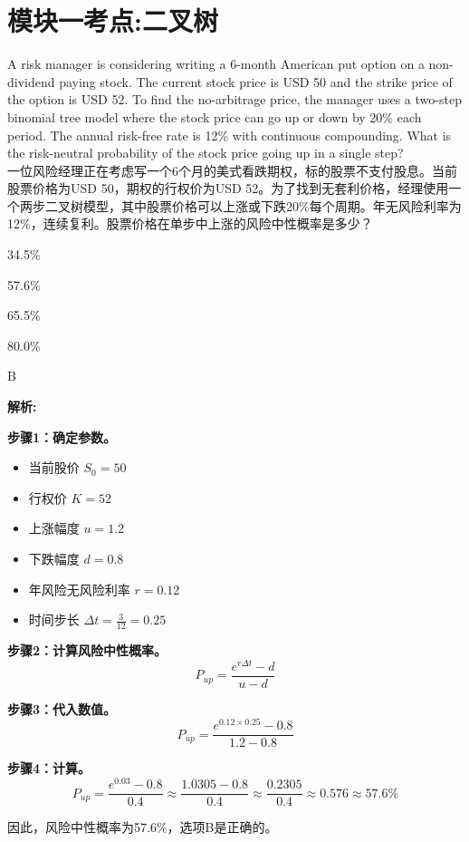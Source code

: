 \documentclass{article}
\newcounter{question} %
\newenvironment{explanation}
{\textbf{解析:}\par}
{\par}
\begin{document}
 \tableofcontents %
\newpage



\iftrue
\section{模块一考点:二叉树}
\setcounter{question}{0}


\begin{question}
    A risk manager is considering writing a 6-month American put option on a non-dividend paying stock. The current stock price is USD 50 and the strike price of the option is USD 52. To find the no-arbitrage price, the manager uses a two-step binomial tree model where the stock price can go up or down by 20\% each period. The annual risk-free rate is 12\% with continuous compounding. What is the risk-neutral probability of the stock price going up in a single step?\\
    一位风险经理正在考虑写一个6个月的美式看跌期权，标的股票不支付股息。当前股票价格为USD 50，期权的行权价为USD 52。为了找到无套利价格，经理使用一个两步二叉树模型，其中股票价格可以上涨或下跌20\%每个周期。年无风险利率为12\%，连续复利。股票价格在单步中上涨的风险中性概率是多少？
\end{question}

\begin{choices}
    \item 34.5\%
    \item 57.6\%
    \item 65.5\%
    \item 80.0\%
\end{choices}

\begin{correctanswer}
    B
\end{correctanswer}

\begin{explanation}
 \textbf{步骤1：确定参数。}
        \begin{itemize}
            \item 当前股价 \( S_0 = 50 \)
            \item 行权价 \( K = 52 \)
            \item 上涨幅度 \( u = 1.2 \)
            \item 下跌幅度 \( d = 0.8 \)
            \item 年风险无风险利率 \( r = 0.12 \)
            \item 时间步长 \( \Delta t = \frac{3}{12} = 0.25 \)
        \end{itemize}

      \textbf{步骤2：计算风险中性概率。}
        \[
        P_{up} = \frac{e^{r \Delta t} - d}{u - d}
        \]

     \textbf{步骤3：代入数值。}
        \[
        P_{up} = \frac{e^{0.12 \times 0.25} - 0.8}{1.2 - 0.8}
        \]

     \textbf{步骤4：计算。}
        \[
        P_{up} = \frac{e^{0.03} - 0.8}{0.4} \approx \frac{1.0305 - 0.8}{0.4} \approx \frac{0.2305}{0.4} \approx 0.576 \approx 57.6\%
        \]

        因此，风险中性概率为57.6\%，选项B是正确的。
\end{explanation}
\end{document}
